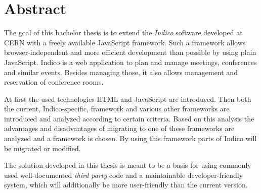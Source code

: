 \chapter*{Abstract}
\thispagestyle{empty}

The goal of this bachelor thesis is to extend the \emph{Indico} software developed at CERN with a
freely available JavaScript framework. Such a framework allows browser-independent and more
efficient development than possible by using plain JavaScript. Indico is a web application to plan
and manage meetings, conferences and similar events. Besides managing those, it also allows
management and reservation of conference rooms.

At first the used technologies HTML and JavaScript are introduced. Then both the current,
Indico-specific, framework and various other frameworks are introduced and analyzed according to
certain criteria. Based on this analysis the advantages and disadvantages of migrating to one of
these frameworks are analyzed and a framework is chosen. By using this framework parts of Indico
will be migrated or modified.

The solution developed in this thesis is meant to be a basis for using commonly used
well-documented \emph{third party} code and a maintainable developer-friendly system, which will
additionally be more user-friendly than the current version.
